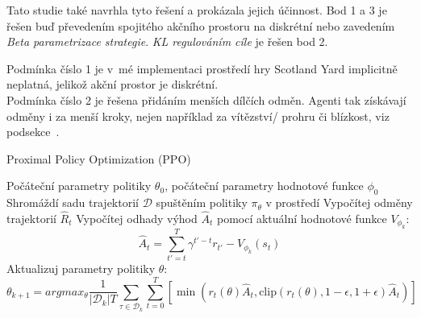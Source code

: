 Tato studie také navrhla tyto řešení a prokázala jejich účinnost.
Bod 1 a 3 je řešen buď převedením spojitého akčního prostoru na diskrétní nebo zavedením \emph{Beta parametrizace strategie}.
\emph{KL regulováním cíle} je řešen bod 2.

Podmínka číslo 1 je v~mé implementaci prostředí hry Scotland Yard implicitně neplatná, jelikož akční prostor je diskrétní.\\
Podmínka číslo 2 je řešena přidáním menších dílčích odměn.
Agenti tak získávají odměny i za menší kroky, nejen například za vítězství/ prohru či blízkost, viz podsekce~.\\

\begin{algorithm}
  \caption{Proximal Policy Optimization (PPO)}
  \begin{algorithmic}[1]
  \Require Počáteční parametry politiky $\theta_0$, počáteční parametry hodnotové funkce $\phi_0$
      \State Shromáždí sadu trajektorií $\mathcal{D}$ spuštěním politiky $\pi_\theta$ v prostředí
      \State Vypočítej odměny trajektorií $\hat{R}_t$
      \State Vypočítej odhady výhod $\hat{A}_t$ pomocí aktuální hodnotové funkce $V_{\phi_k}$:
      \[
      \hat{A}_t = \sum_{t'=t}^T \gamma^{t'-t} r_{t'} - V_{\phi_k}(s_t)
      \]
      \State Aktualizuj parametry politiky $\theta$:
      \[
        \theta_{k+1} = argmax_{\theta} \frac{1}{\left|\mathcal{D}_k\right|T}\displaystyle\sum_{\tau \in \mathcal{D}_k} \sum_{t=0}^T \left[ \min \left( r_t(\theta) \hat{A}_t, \text{clip}(r_t(\theta), 1-\epsilon, 1+\epsilon) \hat{A}_t \right) \right]
      \]
    \EndFor
  \end{algorithmic}
  \end{algorithm}\pagebreak
